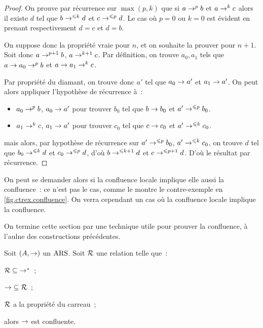 \begin{proof}
  On prouve par récurrence sur $\max(p,k)$ que si $a\mathrel{\to}^p b$ et
  $a\mathrel{\to}^k c$ alors il existe $d$ tel que $b\mathrel{\to}^{\leqslant k} d$ et
  $c\mathrel{\to}^{\leqslant p} d$. Le cas où $p = 0$
  ou $k = 0$ est évident en prenant respectivement $d = c$ et $d = b$.

  On suppose donc la propriété vraie pour $n$, et on souhaite la
  prouver pour $n + 1$. Soit donc $a \mathrel{\to}^{p+1} b$, $a\mathrel{\to}^{k+1} c$.
  Par définition, on trouve $a_0,a_1$ tels que $a\mathrel{\to} a_0 \mathrel{\to}^p b$ et
  $a\mathrel{\to} a_1 \mathrel{\to}^k c$.

  Par propriété du diamant, on trouve donc $a'$ tel que
  $a_0 \mathrel{\to} a'$ et $a_1 \mathrel{\to} a'$. On peut alors appliquer l'hypothèse de
  récurrence à~:
  \begin{itemize}
  \item $a_0 \mathrel{\to}^p b$, $a_0 \mathrel{\to} a'$ pour trouver $b_0$ tel que
    $b \mathrel{\to} b_0$ et $a' \mathrel{\to}^{\leqslant p} b_0$.
  \item $a_1 \mathrel{\to}^k c$, $a_1 \mathrel{\to} a'$ pour trouver $c_0$ tel que
    $c \mathrel{\to} c_0$ et $a' \mathrel{\to}^{\leqslant k} c_0$.
  \end{itemize}
  mais alors, par hypothèse de récurrence sur
  $a' \mathrel{\to}^{\leqslant p} b_0$, $a' \mathrel{\to}^{\leqslant k} c_0$,
  on trouve $d$ tel que $b_0 \mathrel{\to}^{\leqslant k} d$ et $c_0\mathrel{\to}^{\leqslant p} d$,
  d'où $b \mathrel{\to}^{\leqslant k+1} d$ et $c\mathrel{\to}^{\leqslant p+1} d$. D'où le résultat par
  récurrence.
\end{proof}

On peut se demander alors si la confluence locale implique elle aussi la
confluence~: ce n'est pas le cas, comme le montre le contre-exemple en
\cref{fig.ctrex.confluence}. On verra cependant un cas où la confluence
locale implique la confluence.

On termine cette section par une technique utile pour prouver la confluence, à
l'aulne des constructions précédentes.

\begin{lemma}\label{lem.carreau.confluence.clot}
  Soit $(A,\mathrel{\to})$ un $\operatorname{ARS}$. Soit $\mathrel{\mathcal{R}}$ une relation telle que~:
  \begin{itemize}
    \begin{minipage}{0.2\textwidth}
    \item $\mathord{\mathrel{\mathcal{R}}}\subseteq\mathord{\mathrel{\to}^{\mathord{\star}}}$~;
    \end{minipage}
    \begin{minipage}{0.2\textwidth}
    \item $\mathord{\mathrel{\to}}\subseteq\mathord{\mathrel{\mathcal{R}}}$~;
    \end{minipage}
    \begin{minipage}{0.4\textwidth}
    \item $\mathrel{\mathcal{R}}$ a la propriété du carreau~;
    \end{minipage}
  \end{itemize}
  alors $\mathrel{\to}$ est confluente.
\end{lemma}

